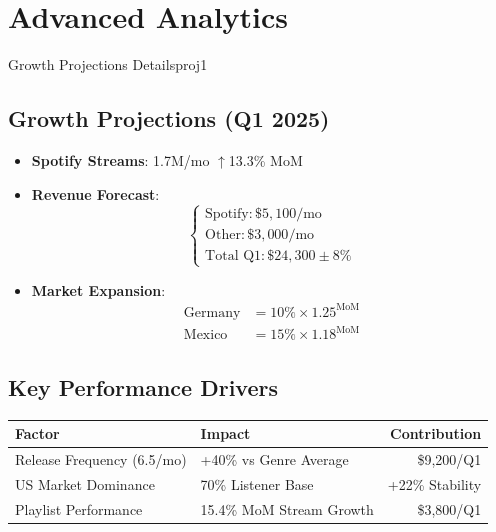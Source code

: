 \documentclass[a4paper]{report}
\begin{document}
\section*{Advanced Analytics}
\begin{ocg}{Growth Projections Details}{proj}{1}
\subsection*{Growth Projections (Q1 2025)}
\begin{itemize}
\item \textbf{Spotify Streams}: 1.7M/mo \quad \(\uparrow\)13.3\% MoM
\item \textbf{Revenue Forecast}:
  \[
  \begin{cases}
  \text{Spotify}: \$5,\!100/\text{mo} \\
  \text{Other}: \$3,\!000/\text{mo} \\
  \text{Total Q1}: \$24,\!300 \pm 8\%
  \end{cases}
  \]
\item \textbf{Market Expansion}:
  \begin{align*}
  \text{Germany} & = 10\% \times 1.25^{\text{MoM}} \\
  \text{Mexico} & = 15\% \times 1.18^{\text{MoM}}
  \end{align*}
\end{itemize}
\end{ocg}

\subsection*{Key Performance Drivers}
\begin{tabularx}{\textwidth}{l X r}
\hline
\rowcolor{primary!20}
\textbf{Factor} & \textbf{Impact} & \textbf{Contribution} \\
\hline
Release Frequency (6.5/mo) & +40\% vs Genre Average & \$9,200/Q1 \\
US Market Dominance & 70\% Listener Base & +22\% Stability \\
Playlist Performance & 15.4\% MoM Stream Growth & \$3,800/Q1 \\
\hline
\end{tabularx}
\end{document}
